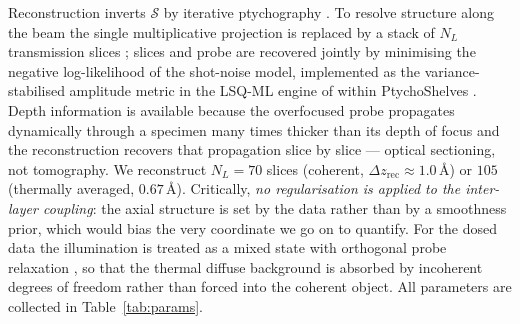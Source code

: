 \documentclass[aps,prb,twocolumn,superscriptaddress,floatfix,nofootinbib]{revtex4-2}
\begin{document}
Reconstruction inverts $\mathcal{S}$ by iterative ptychography
\citep{RodenburgFaulkner2004,Wakonig2020}. To resolve structure along the beam the single
multiplicative projection is replaced by a stack of $N_L$ transmission slices
\citep{MaidenHumphryRodenburg2012}; slices and probe are recovered jointly by minimising the
negative log-likelihood of the shot-noise model, implemented as the variance-stabilised
amplitude metric \citep{ThibaultGuizar2012} in the LSQ-ML engine of \citet{Odstrcil2018}
within PtychoShelves \citep{Wakonig2020}. Depth information is available because the
overfocused probe propagates dynamically through a specimen many times thicker than its depth
of focus and the reconstruction recovers that propagation slice by slice --- optical
sectioning, not tomography. We reconstruct $N_L=70$ slices (coherent,
$\Delta z_{\mathrm{rec}}\approx1.0$\,\AA) or $105$ (thermally averaged, $0.67$\,\AA).
Critically, \emph{no regularisation is applied to the inter-layer coupling}: the axial
structure is set by the data rather than by a smoothness prior, which would bias the very
coordinate we go on to quantify. For the dosed data the illumination is treated as a mixed
state \citep{ThibaultMenzel2013} with orthogonal probe relaxation \citep{Odstrcil2016}, so that
the thermal diffuse background is absorbed by incoherent degrees of freedom rather than forced
into the coherent object. All parameters are collected in Table~\ref{tab:params}.
\end{document}
